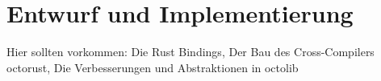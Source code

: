 \chapter{Entwurf und Implementierung}\label{sec:impl}

Hier sollten vorkommen: Die Rust Bindings, Der Bau des Cross-Compilers octorust, Die Verbesserungen und Abstraktionen in octolib
